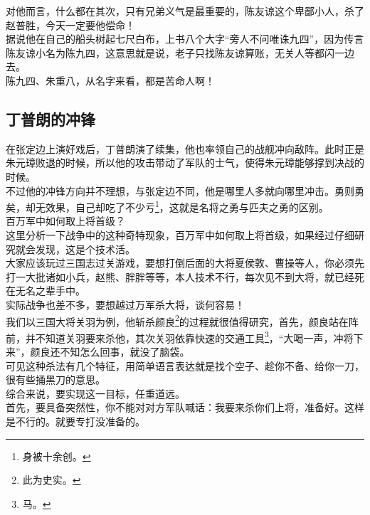\begin{multicols}{\theparacolNo}
对他而言，什么都在其次，只有兄弟义气是最重要的，陈友谅这个卑鄙小人，杀了赵普胜，今天一定要他偿命！\\

据说他在自己的船头树起七尺白布，上书八个大字“旁人不问唯诛九四”，因为传言陈友谅小名为陈九四，这意思就是说，老子只找陈友谅算账，无关人等都闪一边去。\\

陈九四、朱重八，从名字来看，都是苦命人啊！\\

\subsection{丁普朗的冲锋}
在张定边上演好戏后，丁普朗演了续集，他也率领自己的战舰冲向敌阵。此时正是朱元璋败退的时候，所以他的攻击带动了军队的士气，使得朱元璋能够撑到决战的时候。\\

不过他的冲锋方向并不理想，与张定边不同，他是哪里人多就向哪里冲击。勇则勇矣，却无效果，自己却吃了不少亏\footnote{身被十余创。}，这就是名将之勇与匹夫之勇的区别。\\

百万军中如何取上将首级？\\

这里分析一下战争中的这种奇特现象，百万军中如何取上将首级，如果经过仔细研究就会发现，这是个技术活。\\

大家应该玩过三国志过关游戏，要想打倒后面的大将夏侯敦、曹操等人，你必须先打一大批诸如小兵，赵熊、胖胖等等，本人技术不行，每次见不到大将，就已经死在无名之辈手中。\\

实际战争也差不多，要想越过万军杀大将，谈何容易！\\

我们以三国大将关羽为例，他斩杀颜良\footnote{此为史实。}的过程就很值得研究，首先，颜良站在阵前，并不知道关羽要来杀他，其次关羽依靠快速的交通工具\footnote{马。}，“大喝一声，冲将下来”，颜良还不知怎么回事，就没了脑袋。\\

可见这种杀法有几个特征，用简单语言表达就是找个空子、趁你不备、给你一刀，很有些捅黑刀的意思。\\

综合来说，要实现这一目标，任重道远。\\

首先，要具备突然性，你不能对对方军队喊话：我要来杀你们上将，准备好。这样是不行的。就要专打没准备的。\\


\end{multicols}
